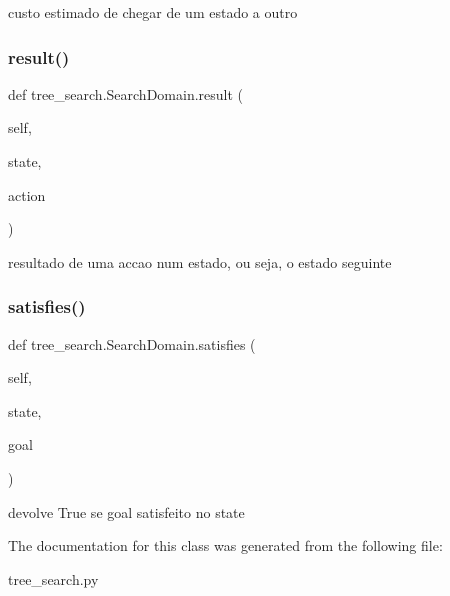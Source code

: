 \begin{DoxyVerb}custo estimado de chegar de um estado a outro\end{DoxyVerb}
 \mbox{\label{classtree__search_1_1_search_domain_ad648ea701b43371cf3e5a417696b548a}} 
\subsubsection{\texorpdfstring{result()}{result()}}
{\footnotesize\ttfamily def tree\+\_\+search.\+Search\+Domain.\+result (\begin{DoxyParamCaption}\item[{}]{self,  }\item[{}]{state,  }\item[{}]{action }\end{DoxyParamCaption})}

\begin{DoxyVerb}resultado de uma accao num estado, ou seja, o estado seguinte\end{DoxyVerb}
 \mbox{\label{classtree__search_1_1_search_domain_a84bde7249dd756455329b0bfb6977b61}} 
\subsubsection{\texorpdfstring{satisfies()}{satisfies()}}
{\footnotesize\ttfamily def tree\+\_\+search.\+Search\+Domain.\+satisfies (\begin{DoxyParamCaption}\item[{}]{self,  }\item[{}]{state,  }\item[{}]{goal }\end{DoxyParamCaption})}

\begin{DoxyVerb}devolve True se goal satisfeito no state\end{DoxyVerb}
 

The documentation for this class was generated from the following file\+:\begin{DoxyCompactItemize}
\item 
tree\+\_\+search.\+py\end{DoxyCompactItemize}
